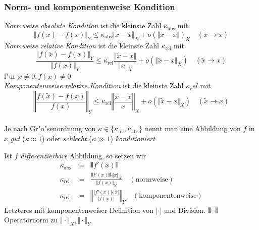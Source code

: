 \documentclass{scrartcl}
\begin{document}
 \subsubsection{Norm- und komponentenweise Kondition}
 \begin{Def}
 \emph{Normweise absolute Kondition} ist die kleinste Zahl $\kappa_{\mathrm{abs}}$ mit $$\Vert f(\tilde{x}) - f(x) \Vert_{Y} \leq \kappa_{\mathrm{abs}} \Vert \tilde{x} - x \Vert_{X} + o ( \Vert \tilde{x} - x \Vert )_{X}  \quad (\tilde{x} \rightarrow x)$$
 \emph{Normweise relative Kondition} ist die kleinste Zahl $\kappa_\mathrm{rel}$ mit 
 $$\frac{ \Vert f(\tilde{x}) - f(x) \Vert_Y}{\Vert f(x) \Vert_Y} \leq \kappa_{\mathrm{rel}} \frac{ \Vert \tilde{x} - x \Vert}{\Vert x \Vert_X} + o( \Vert \tilde{x} - x \Vert_X ) \quad (\tilde{x} \rightarrow x)$$
 f"ur $x \neq 0, f(x) \neq 0$ \\
 \emph{Komponentenweise relative Kondition} ist die kleinste Zahl $\kappa_rel$ mit 
 $$ \left\Vert \frac{ f(\tilde{x}) - f(x)}{ f(x)} \right\Vert_Y \leq \kappa_{\mathrm{rel}} \left\Vert \frac{ \tilde{x} - x }{ x } \right\Vert_X + o( \Vert \tilde{x} - x \Vert_X ) \quad (\tilde{x} \rightarrow x)$$ \\ 
 Je nach Gr"o"senordnung von $\kappa \in \{ \kappa_\mathrm{rel}, \kappa_\mathrm{abs} \}$ nennt man eine Abbildung von $f$ in $x$ \emph{gut} ($\kappa \approx 1$) oder \emph{schlecht} ($\kappa \gg 1$) \emph{konditioniert}
 \end{Def}
Ist $f$ \emph{differenzierbare} Abbildung, so setzen wir
\begin{eqnarray*}
\kappa_\mathrm{abs} & := & \Vvert f'(x) \Vvert \\
\kappa_\mathrm{rel} & := & \frac{ \Vvert f'(x) \Vvert \cdot \Vert x \Vert_X}{\Vert f(x) \Vert_Y} \quad (\mathrm{normweise}) \\
\kappa_\mathrm{rel} & := & \left\Vert \frac{ \vert f'(x) \vert \cdot \vert x \vert }{ \vert f(x) \vert } \right\Vert_Y \quad \mathrm{(komponentenweise)}
\end{eqnarray*}
Letzteres mit komponentenweiser Definition von $\vert \cdot \vert$ und Division. $\Vvert \cdot \Vvert$ Operatornorm zu $\Vert \cdot \Vert_X, \Vert \cdot \Vert_Y$ 
\end{document}
